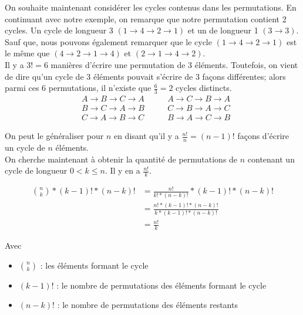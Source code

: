 	On souhaite maintenant considérer les cycles contenus dans les permutations.
	En continuant avec notre exemple, on remarque que notre permutation contient 2 cycles.
	Un cycle de longueur 3 $(1 \rightarrow 4 \rightarrow 2 \rightarrow 1)$ et un de longueur 1 $(3 \rightarrow 3)$.
	Sauf que, nous pouvons également remarquer que le cycle $(1 \rightarrow 4 \rightarrow 2 \rightarrow 1)$ est le même que $(4 \rightarrow 2 \rightarrow 1 \rightarrow 4)$ et $(2 \rightarrow 1 \rightarrow 4 \rightarrow 2)$. \\
	Il y a $3! = 6$ manières d'écrire une permutation de 3 éléments.
	Toutefois, on vient de dire qu'un cycle de 3 éléments pouvait s'écrire de 3 façons différentes; alors parmi ces $6$ permutations, il n'existe que $\frac{6}{3} = 2$ cycles distincts.
	\begin{align*}
		 & A \rightarrow B \rightarrow C \rightarrow A \qquad & A \rightarrow C  \rightarrow B \rightarrow A \\
		 & B \rightarrow C \rightarrow A \rightarrow B \qquad & C \rightarrow B  \rightarrow A \rightarrow C \\
		 & C \rightarrow A \rightarrow B \rightarrow C \qquad & B \rightarrow A  \rightarrow C \rightarrow B
	\end{align*}

	On peut le généraliser pour $n$ en disant qu'il y a $\frac{n!}{n} = (n-1)!$ façons d'écrire un cycle de $n$ éléments. \\

	On cherche maintenant à obtenir la quantité de permutations de $n$ contenant un cycle de longueur $ 0 < k \leq n$.
	Il y en a $\frac{n!}{k}$.

	\begin{align*}
		\binom{n}{k} * (k - 1)! * (n - k)! & = \frac{n!}{k! * (n - k)!} * (k - 1)! * (n - k)!           \\
		                                   & = \frac{n! * (k - 1)! * (n - k)!}{k * (k - 1)! * (n - k)!} \\
		                                   & = \frac{n!}{k}
	\end{align*}

	Avec
	\begin{itemize}
		\item $\binom{n}{k}$ : les éléments formant le cycle
		\item $(k - 1)!$ : le nombre de permutations des éléments formant le cycle
		\item $(n - k)!$ : le nombre de permutations des éléments restants
	\end{itemize}
